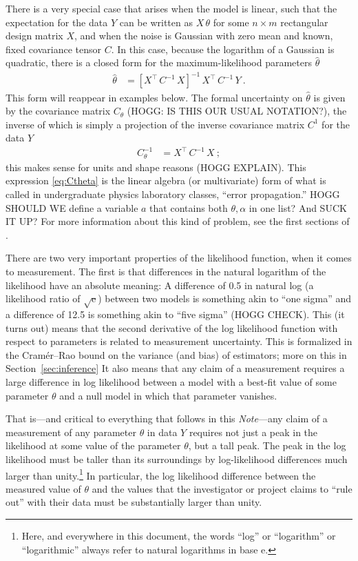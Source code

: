 \documentclass{article}
\newcommand{\documentname}{\textsl{Note}}
\newcommand{\sectionname}{Section}
\newcommand{\secref}[1]{\sectionname~\ref{#1}}
\newcommand{\e}{\mathrm{e}} %
\begin{document}
There is a very special case that arises when the model is linear,
such that the expectation for the data $Y$ can be written as $X\,\theta$ for some $n\times m$ rectangular design matrix $X$,
and when the noise is Gaussian with zero mean and known, fixed covariance tensor $C$.
In this case, because the logarithm of a Gaussian is quadratic, there is a closed form for the maximum-likelihood parameters $\hat\theta$
\begin{align}
    \hat\theta &= [X^\top\,C^{-1}\,X]^{-1}\,X^\top\,C^{-1}\,Y ~.\label{eq:wls}
\end{align}
This form will reappear in examples below.
The formal uncertainty on $\hat\theta$ is given by the covariance matrix $C_\theta$ (HOGG: IS THIS OUR USUAL NOTATION?), the inverse of which is simply a projection of the inverse covariance matrix $C^{1}$ for the data $Y$
\begin{align}
    C_\theta^{-1} &= X^\top\,C^{-1}\,X ~; \label{eq:Ctheta}
\end{align}
this makes sense for units and shape reasons (HOGG EXPLAIN).
This expression \eqref{eq:Ctheta} is the linear algebra (or multivariate) form of what is called in undergraduate physics laboratory classes, ``error propagation.''
HOGG SHOULD WE define a variable $a$ that contains both $\theta,\alpha$ in one list? And SUCK IT UP?
For more information about this kind of problem, see the first sections of \cite{fittingaline}.

There are two very important properties of the likelihood function, when it comes to measurement.
The first is that differences in the natural logarithm of the likelihood have an absolute meaning:
A difference of 0.5 in natural log (a likelihood ratio of $\sqrt{\e}$) between two models is something akin to ``one sigma'' and a difference of 12.5 is something akin to ``five sigma'' (HOGG CHECK).
This (it turns out) means that the second derivative of the log likelihood function with respect to parameters is related to measurement uncertainty.
This is formalized in the Cram\'er--Rao bound \cite{cramer, rao} on the variance (and bias) of estimators; more on this in \secref{sec:inference}
It also means that any claim of a measurement requires a large difference in log likelihood between a model with a best-fit value of some parameter $\theta$ and a null model in which that parameter vanishes.

That is---and critical to everything that follows in this \documentname---any claim of a measurement of any parameter $\theta$ in data $Y$ requires not just a peak in the likelihood at some value of the parameter $\theta$, but a tall peak.
The peak in the log likelihood must be taller than its surroundings by log-likelihood differences much larger than unity.\footnote{Here, and everywhere in this document, the words ``log'' or ``logarithm'' or ``logarithmic'' always refer to natural logarithms in base $\e$.}
In particular, the log likelihood difference between the measured value of $\theta$ and the values that the investigator or project claims to ``rule out'' with their data must be substantially larger than unity.
\end{document}
